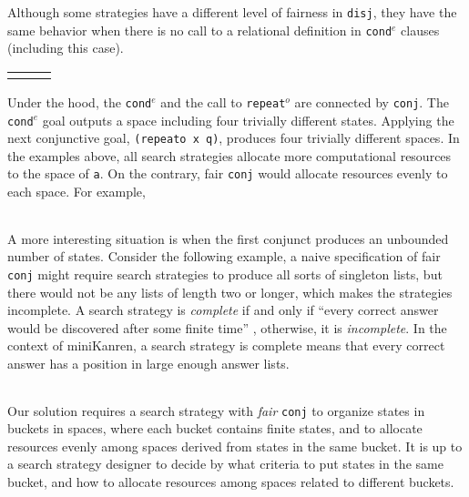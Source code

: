 \documentclass[format=acmlarge, review=true, authordraft=true]{acmart}
\newcommand{\conde}{\texttt{cond$^e$}}
\newcommand{\conj}{\texttt{conj}}
\newcommand{\disj}{\texttt{disj}}
\newcommand{\repeato}{\texttt{repeat$^o$}}
\begin{document}
Although some strategies have a different level of fairness in \disj{}, they 
have the same behavior when there is no call to a relational definition in 
\conde{} clauses (including this case).

\begin{center}
\begin{tabular}{l|c|r}
     &
     &
     \\
\end{tabular}
\end{center}

Under the hood, the \conde{} and the call to \repeato{} are connected by 
\conj{}. The \conde{} goal outputs a space including four trivially 
different states. 
Applying the next conjunctive goal, \texttt{(repeato x q)}, produces four 
trivially different spaces.
In the examples above, all search strategies allocate more computational 
resources to the space of \texttt{a}. On the contrary, fair \conj{} 
would allocate resources evenly to each space. For example,

\begin{center}
	\begin{tabular}{c}
		
	\end{tabular}
\end{center}

A more interesting situation is when the first conjunct produces an unbounded
number of states. Consider the following example, a naive specification of 
fair \conj{} 
might require search strategies to produce all sorts of singleton lists, but 
there
would not be any lists of length two or longer, which makes the strategies 
incomplete. 
A search strategy is \emph{complete} if and only if ``every correct answer 
would be discovered after some finite time'' \cite{seres1999algebra}, 
otherwise, it is \emph{incomplete}. In the 
context of miniKanren, a search strategy is complete means that every correct 
answer has a position in large enough answer lists.

\begin{center}
	\begin{tabular}{c}
		
	\end{tabular}
\end{center}

Our solution requires a search strategy with \emph{fair} \conj{} to organize
states in buckets in spaces, where each bucket contains finite states, 
and 
to allocate resources evenly among spaces derived from states in the 
same bucket. It is up to a search strategy designer to decide by what criteria 
to 
put states in the same bucket, and how to allocate resources among spaces 
related to different buckets.
\end{document}
